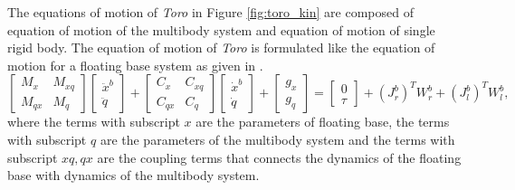 The equations of motion of \emph{Toro} in Figure \ref{fig:toro_kin} are composed of equation of motion of the multibody system and equation of motion of single rigid body. The equation of motion of \emph{Toro} is formulated like the equation of motion for a floating base system as given in \cite{ott09}.
\begin{equation} \label{eq:dyn_biped}
\begin{bmatrix}
M_x &M_{xq} \\ M_{qx} &M_q
\end{bmatrix}
\begin{bmatrix}
\ddot{x}^b \\ \ddot{q}
\end{bmatrix}
+
\begin{bmatrix}
C_x &C_{xq} \\ C_{qx} &C_q
\end{bmatrix}
\begin{bmatrix}
\dot{x}^b \\ \dot{q}
\end{bmatrix}
+
\begin{bmatrix}
g_x \\ g_q
\end{bmatrix}
=
\begin{bmatrix}
0 \\ \tau
\end{bmatrix}
+ (J_r^b)^T W_r^b + (J_l^b)^T W_l^b,
\end{equation}
where the terms with subscript $x$ are the parameters of floating  base, the terms with subscript $q$ are the parameters of the multibody system and the terms with subscript $xq, qx$ are the coupling terms that connects the dynamics of the floating base with dynamics of the multibody system.

